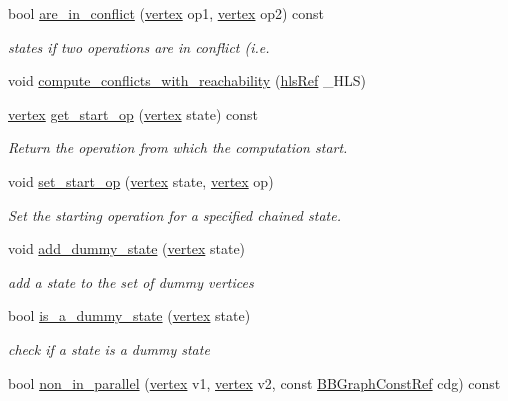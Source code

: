 \begin{DoxyCompactItemize}
bool \hyperlink{classliveness_a7ada63832c3f09f5e9ab213ebb6ebacf}{are\+\_\+in\+\_\+conflict} (\hyperlink{graph_8hpp_abefdcf0544e601805af44eca032cca14}{vertex} op1, \hyperlink{graph_8hpp_abefdcf0544e601805af44eca032cca14}{vertex} op2) const
\begin{DoxyCompactList}\small\item\em states if two operations are in conflict (i.\+e. \end{DoxyCompactList}\item 
void \hyperlink{classliveness_abb7fa56c7956948411c80808825906a9}{compute\+\_\+conflicts\+\_\+with\+\_\+reachability} (\hyperlink{hls_8hpp_a75d0c73923d0ddfa28c4843a802c73a7}{hls\+Ref} \+\_\+\+H\+LS)
\item 
\hyperlink{graph_8hpp_abefdcf0544e601805af44eca032cca14}{vertex} \hyperlink{classliveness_ad5809b83204b0da9292fae80d9730139}{get\+\_\+start\+\_\+op} (\hyperlink{graph_8hpp_abefdcf0544e601805af44eca032cca14}{vertex} state) const
\begin{DoxyCompactList}\small\item\em Return the operation from which the computation start. \end{DoxyCompactList}\item 
void \hyperlink{classliveness_a881b06559227c29787f7c0d19a3e9245}{set\+\_\+start\+\_\+op} (\hyperlink{graph_8hpp_abefdcf0544e601805af44eca032cca14}{vertex} state, \hyperlink{graph_8hpp_abefdcf0544e601805af44eca032cca14}{vertex} op)
\begin{DoxyCompactList}\small\item\em Set the starting operation for a specified chained state. \end{DoxyCompactList}\item 
void \hyperlink{classliveness_a8703aab0a7ace68883d5e7118f0dd2f1}{add\+\_\+dummy\+\_\+state} (\hyperlink{graph_8hpp_abefdcf0544e601805af44eca032cca14}{vertex} state)
\begin{DoxyCompactList}\small\item\em add a state to the set of dummy vertices \end{DoxyCompactList}\item 
bool \hyperlink{classliveness_a4445a17a1bd1fa7190ee4c5b318fb47f}{is\+\_\+a\+\_\+dummy\+\_\+state} (\hyperlink{graph_8hpp_abefdcf0544e601805af44eca032cca14}{vertex} state)
\begin{DoxyCompactList}\small\item\em check if a state is a dummy state \end{DoxyCompactList}\item 
bool \hyperlink{classliveness_a0ff38bbfa3d6bc5a3228fe2c1bd408f7}{non\+\_\+in\+\_\+parallel} (\hyperlink{graph_8hpp_abefdcf0544e601805af44eca032cca14}{vertex} v1, \hyperlink{graph_8hpp_abefdcf0544e601805af44eca032cca14}{vertex} v2, const \hyperlink{basic__block_8hpp_ab66bdbde3a29e41d079d8a320af9c921}{B\+B\+Graph\+Const\+Ref} cdg) const
\end{DoxyCompactItemize}
